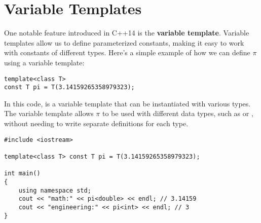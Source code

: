 \documentclass[12pt]{article}
\begin{document}
\section{Variable Templates}

\noindent
One notable feature introduced in C++14 is the \textbf{variable template}. Variable templates allow us to define parameterized constants, making it easy to work with constants of different types. Here's a simple example of how we can define $\pi$ using a variable template:

\begin{lstlisting}[style=cxx]
template<class T>
const T pi = T(3.14159265358979323);
\end{lstlisting}

\noindent
In this code,  is a variable template that can be instantiated with various types. The variable template allows $\pi$ to be used with different data types, such as  or , without needing to write separate definitions for each type.

\begin{lstlisting}[style=cxx]
#include <iostream>

template<class T> const T pi = T(3.14159265358979323);

int main()
{
    using namespace std;
    cout << "math:" << pi<double> << endl; // 3.14159
    cout << "engineering:" << pi<int> << endl; // 3
}
\end{lstlisting}
\end{document}
